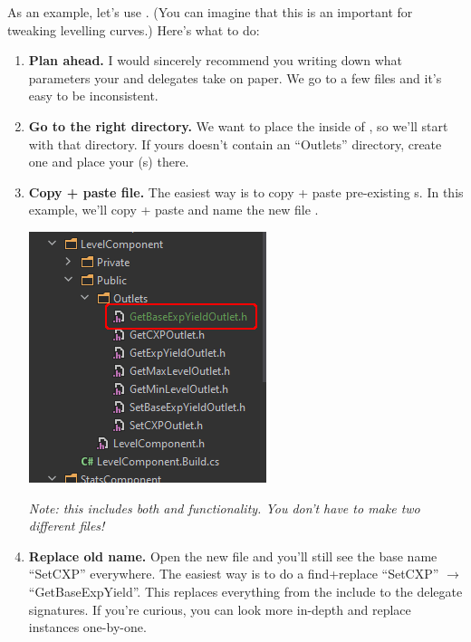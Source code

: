 

As an example, let's use . (You can imagine that this is an important  for tweaking levelling curves.) Here's what to do:\\

\begin{enumerate}
	\item{\textbf{Plan ahead.} I would sincerely recommend you writing down what parameters your   and  delegates take on paper. We go to a few files and it's easy to be inconsistent.}
	\item{\textbf{Go to the right directory.} We want to place the  inside of , so we'll start with that directory. If yours doesn't contain an ``Outlets'' directory, create one and place your (s) there.}
	\item{\textbf{Copy + paste file.} The easiest way is to copy + paste pre-existing s. In this example, we'll copy + paste  and name the new file . \\
	\begin{center}
		\includegraphics[scale=\ScreenshotScale]{create-outlet-rename}
	\end{center}
	\noindent \textit{Note: this includes both  and  functionality. You don't have to make two different files!}
	}
	\item{\textbf{Replace old name.} Open the new file and you'll still see the base name ``SetCXP'' everywhere. The easiest way is to do a find+replace ``SetCXP'' $\rightarrow$ ``GetBaseExpYield''. This replaces everything from the  include to the delegate signatures. If you're curious, you can look more in-depth and replace instances one-by-one.}

\end{enumerate}
